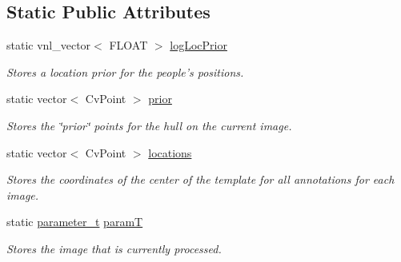 \subsection*{Static Public Attributes}
\begin{DoxyCompactItemize}
\item 
\hypertarget{classAnnotatePos_a337c4cd7f149bc0c775c244d75ed9293}{
static vnl\_\-vector$<$ FLOAT $>$ \hyperlink{classAnnotatePos_a337c4cd7f149bc0c775c244d75ed9293}{logLocPrior}}
\label{classAnnotatePos_a337c4cd7f149bc0c775c244d75ed9293}

\begin{DoxyCompactList}\small\item\em Stores a location prior for the people's positions. \item\end{DoxyCompactList}\item 
\hypertarget{classAnnotatePos_a899d3aff6fc24618b39966171b723bcd}{
static vector$<$ CvPoint $>$ \hyperlink{classAnnotatePos_a899d3aff6fc24618b39966171b723bcd}{prior}}
\label{classAnnotatePos_a899d3aff6fc24618b39966171b723bcd}

\begin{DoxyCompactList}\small\item\em Stores the \char`\"{}prior\char`\"{} points for the hull on the current image. \item\end{DoxyCompactList}\item 
\hypertarget{classAnnotatePos_a9d4937e46b9fac69334d5fc7ea3f37a6}{
static vector$<$ CvPoint $>$ \hyperlink{classAnnotatePos_a9d4937e46b9fac69334d5fc7ea3f37a6}{locations}}
\label{classAnnotatePos_a9d4937e46b9fac69334d5fc7ea3f37a6}

\begin{DoxyCompactList}\small\item\em Stores the coordinates of the center of the template for all annotations for each image. \item\end{DoxyCompactList}\item 
\hypertarget{classAnnotatePos_af4f2a0cd670f95418534a9678456c2e3}{
static \hyperlink{structparameter__t}{parameter\_\-t} \hyperlink{classAnnotatePos_af4f2a0cd670f95418534a9678456c2e3}{paramT}}
\label{classAnnotatePos_af4f2a0cd670f95418534a9678456c2e3}

\begin{DoxyCompactList}\small\item\em Stores the image that is currently processed. \item\end{DoxyCompactList}\end{DoxyCompactItemize}


